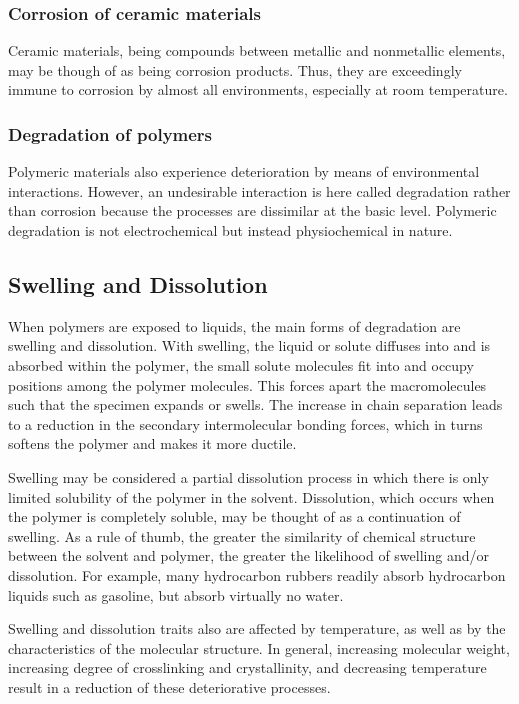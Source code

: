 \subsubsection{Corrosion of ceramic materials}
Ceramic materials, being compounds between metallic and nonmetallic elements, may be though of as being corrosion products. Thus, they are exceedingly immune to corrosion by almost all environments, especially at room temperature.


\subsubsection{Degradation of polymers}
Polymeric materials also experience deterioration by means of environmental interactions. However, an undesirable interaction is here called degradation rather than corrosion because the processes are dissimilar at the basic level. Polymeric degradation is not electrochemical but instead physiochemical in nature. 


\subsection{Swelling and Dissolution}
When polymers are exposed to liquids, the main forms of degradation are swelling and dissolution. With swelling, the liquid or solute diffuses into and is absorbed within the polymer, the small solute molecules fit into and occupy positions among the polymer molecules. This forces apart the macromolecules such that the specimen expands or swells. The increase in chain separation leads to a reduction in the secondary intermolecular bonding forces, which in turns softens the polymer and makes it more ductile. 

Swelling may be considered a partial dissolution process in which there is only limited solubility of the polymer in the solvent. Dissolution, which occurs when the polymer is completely soluble, may be thought of as a continuation of swelling. As a rule of thumb, the greater the similarity of chemical structure between the solvent and polymer, the greater the likelihood of swelling and/or dissolution. For example, many hydrocarbon rubbers readily absorb hydrocarbon liquids such as gasoline, but absorb virtually no water.

Swelling and dissolution traits also are affected by temperature, as well as by the characteristics of the molecular structure. In general, increasing molecular weight, increasing degree of crosslinking and crystallinity, and decreasing temperature result in a reduction of these deteriorative processes.

